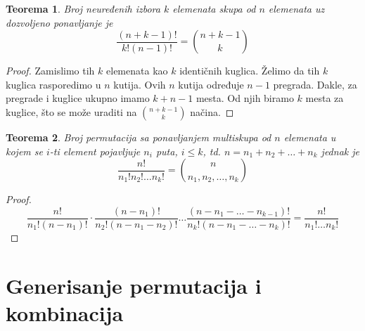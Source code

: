 \documentclass[a4paper,12pt]{article}
\numberwithin{algorithm}{section}
\theoremstyle{plain}
\newtheorem{theorem}{Teorema}[section]
\theoremstyle{definition}
\theoremstyle{remark}
\begin{document}
\begin{theorem}
    Broj neuređenih izbora $k$ elemenata skupa od $n$ elemenata uz dozvoljeno ponavljanje je
    \[ \frac{(n + k - 1)!}{k!(n-1)!} = {{n + k - 1} \choose k}\]
\end{theorem}
\begin{proof}
    Zamislimo tih $k$ elemenata kao $k$ identičnih kuglica. Želimo da tih $k$ kuglica rasporedimo u $n$ kutija. Ovih $n$ kutija određuje $n - 1$ pregrada. Dakle, za pregrade i kuglice ukupno imamo $k + n - 1$ mesta. Od njih biramo $k$ mesta za kuglice, što se može uraditi na ${{n + k -1} \choose k}$ načina.
\end{proof}


\begin{theorem}
    Broj permutacija sa ponavljanjem multiskupa od $n$ elemenata u kojem se $i$-ti element pojavljuje $n_i$ puta, $i \leq k$, td. $n = n_1 + n_2 + \dots + n_k$ jednak je
    \[ \frac{n!}{n_1! n_2! \dots n_k!} = {{n} \choose {n_1, n_2, \dots, n_k}} \]
\end{theorem}
\begin{proof}
    \[\frac{n!}{n_1!(n-n_1)!}\cdot \frac{(n-n_1)!}{n_2!(n - n_1 - n_2)!} \dots \frac{(n - n_1 - \dots - n_{k-1})!}{n_k!(n - n_1 - \dots -n_k)!} = \frac{n!}{n_1!\dots n_k!}\]
\end{proof}
\newpage
\section{Generisanje permutacija i kombinacija}
\end{document}
